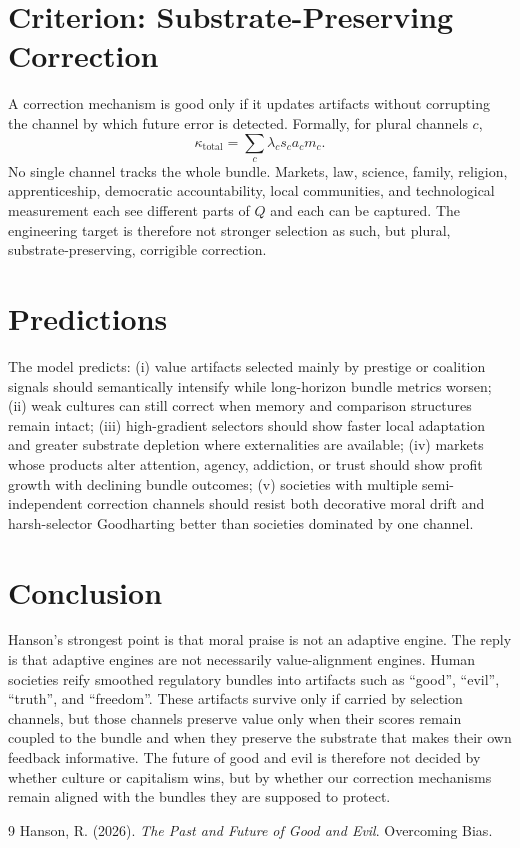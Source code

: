 \documentclass[10pt,twocolumn]{article}
\begin{document}
\section{Criterion: Substrate-Preserving Correction}
A correction mechanism is good only if it updates artifacts without corrupting the channel by which future error is detected. Formally, for plural channels $c$,
\begin{equation}
\kappa_{\mathrm{total}} = \sum_c \lambda_c s_c a_c m_c.
\end{equation}
No single channel tracks the whole bundle. Markets, law, science, family, religion, apprenticeship, democratic accountability, local communities, and technological measurement each see different parts of $Q$ and each can be captured. The engineering target is therefore not stronger selection as such, but plural, substrate-preserving, corrigible correction.

\section{Predictions}
The model predicts: (i) value artifacts selected mainly by prestige or coalition signals should semantically intensify while long-horizon bundle metrics worsen; (ii) weak cultures can still correct when memory and comparison structures remain intact; (iii) high-gradient selectors should show faster local adaptation and greater substrate depletion where externalities are available; (iv) markets whose products alter attention, agency, addiction, or trust should show profit growth with declining bundle outcomes; (v) societies with multiple semi-independent correction channels should resist both decorative moral drift and harsh-selector Goodharting better than societies dominated by one channel.

\section{Conclusion}
Hanson's strongest point is that moral praise is not an adaptive engine. The reply is that adaptive engines are not necessarily value-alignment engines. Human societies reify smoothed regulatory bundles into artifacts such as ``good'', ``evil'', ``truth'', and ``freedom''. These artifacts survive only if carried by selection channels, but those channels preserve value only when their scores remain coupled to the bundle and when they preserve the substrate that makes their own feedback informative. The future of good and evil is therefore not decided by whether culture or capitalism wins, but by whether our correction mechanisms remain aligned with the bundles they are supposed to protect.

\begin{thebibliography}{9}\setlength{\itemsep}{0pt}
 Hanson, R. (2026). \emph{The Past and Future of Good and Evil}. Overcoming Bias.
\end{thebibliography}
\end{document}
